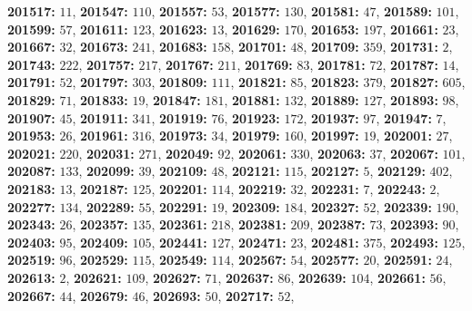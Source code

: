 \textsf{\bfseries 201517:} $11$, \textsf{\bfseries 201547:} $110$, \textsf{\bfseries 201557:} $53$, \textsf{\bfseries 201577:} $130$, \textsf{\bfseries 201581:} $47$, \textsf{\bfseries 201589:} $101$, \textsf{\bfseries 201599:} $57$, \textsf{\bfseries 201611:} $123$, \textsf{\bfseries 201623:} $13$, \textsf{\bfseries 201629:} $170$, \textsf{\bfseries 201653:} $197$, \textsf{\bfseries 201661:} $23$, \textsf{\bfseries 201667:} $32$, \textsf{\bfseries 201673:} $241$, \textsf{\bfseries 201683:} $158$, \textsf{\bfseries 201701:} $48$, \textsf{\bfseries 201709:} $359$, \textsf{\bfseries 201731:} $2$, \textsf{\bfseries 201743:} $222$, \textsf{\bfseries 201757:} $217$, \textsf{\bfseries 201767:} $211$, \textsf{\bfseries 201769:} $83$, \textsf{\bfseries 201781:} $72$, \textsf{\bfseries 201787:} $14$, \textsf{\bfseries 201791:} $52$, \textsf{\bfseries 201797:} $303$, \textsf{\bfseries 201809:} $111$, \textsf{\bfseries 201821:} $85$, \textsf{\bfseries 201823:} $379$, \textsf{\bfseries 201827:} $605$, \textsf{\bfseries 201829:} $71$, \textsf{\bfseries 201833:} $19$, \textsf{\bfseries 201847:} $181$, \textsf{\bfseries 201881:} $132$, \textsf{\bfseries 201889:} $127$, \textsf{\bfseries 201893:} $98$, \textsf{\bfseries 201907:} $45$, \textsf{\bfseries 201911:} $341$, \textsf{\bfseries 201919:} $76$, \textsf{\bfseries 201923:} $172$, \textsf{\bfseries 201937:} $97$, \textsf{\bfseries 201947:} $7$, \textsf{\bfseries 201953:} $26$, \textsf{\bfseries 201961:} $316$, \textsf{\bfseries 201973:} $34$, \textsf{\bfseries 201979:} $160$, \textsf{\bfseries 201997:} $19$, \textsf{\bfseries 202001:} $27$, \textsf{\bfseries 202021:} $220$, \textsf{\bfseries 202031:} $271$, \textsf{\bfseries 202049:} $92$, \textsf{\bfseries 202061:} $330$, \textsf{\bfseries 202063:} $37$, \textsf{\bfseries 202067:} $101$, \textsf{\bfseries 202087:} $133$, \textsf{\bfseries 202099:} $39$, \textsf{\bfseries 202109:} $48$, \textsf{\bfseries 202121:} $115$, \textsf{\bfseries 202127:} $5$, \textsf{\bfseries 202129:} $402$, \textsf{\bfseries 202183:} $13$, \textsf{\bfseries 202187:} $125$, \textsf{\bfseries 202201:} $114$, \textsf{\bfseries 202219:} $32$, \textsf{\bfseries 202231:} $7$, \textsf{\bfseries 202243:} $2$, \textsf{\bfseries 202277:} $134$, \textsf{\bfseries 202289:} $55$, \textsf{\bfseries 202291:} $19$, \textsf{\bfseries 202309:} $184$, \textsf{\bfseries 202327:} $52$, \textsf{\bfseries 202339:} $190$, \textsf{\bfseries 202343:} $26$, \textsf{\bfseries 202357:} $135$, \textsf{\bfseries 202361:} $218$, \textsf{\bfseries 202381:} $209$, \textsf{\bfseries 202387:} $73$, \textsf{\bfseries 202393:} $90$, \textsf{\bfseries 202403:} $95$, \textsf{\bfseries 202409:} $105$, \textsf{\bfseries 202441:} $127$, \textsf{\bfseries 202471:} $23$, \textsf{\bfseries 202481:} $375$, \textsf{\bfseries 202493:} $125$, \textsf{\bfseries 202519:} $96$, \textsf{\bfseries 202529:} $115$, \textsf{\bfseries 202549:} $114$, \textsf{\bfseries 202567:} $54$, \textsf{\bfseries 202577:} $20$, \textsf{\bfseries 202591:} $24$, \textsf{\bfseries 202613:} $2$, \textsf{\bfseries 202621:} $109$, \textsf{\bfseries 202627:} $71$, \textsf{\bfseries 202637:} $86$, \textsf{\bfseries 202639:} $104$, \textsf{\bfseries 202661:} $56$, \textsf{\bfseries 202667:} $44$, \textsf{\bfseries 202679:} $46$, \textsf{\bfseries 202693:} $50$, \textsf{\bfseries 202717:} $52$, 
